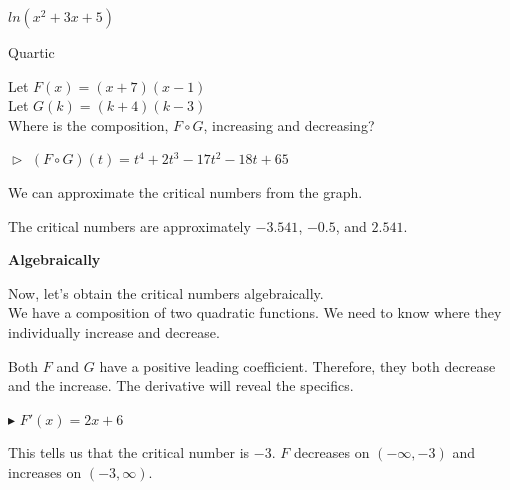 \documentclass{ximera}
\begin{document}
\begin{example}   $ln(x^2 + 3x + 5)$




\end{example}



















\begin{example}   Quartic



Let $F(x) = (x+7)(x-1)$ \\


Let $G(k) = (k+4)(k-3)$ \\



Where is the composition, $F \circ G$, increasing and decreasing?


$\vartriangleright$   $(F \circ G)(t) = t^4 +2 t^3 -17 t^2 - 18 t + 65$





We can approximate the critical numbers from the graph.



\begin{center}
\end{center}


The critical numbers are approximately $-3.541$, $-0.5$, and $2.541$.


\textbf{\textcolor{red!80!black}{Algebraically}}


Now, let's obtain the critical numbers algebraically. \\


We have a composition of two quadratic functions.  We need to know where they individually increase and decrease.

Both $F$ and $G$ have a positive leading coefficient.  Therefore, they both decrease and the increase. The derivative will reveal the specifics.



$\blacktriangleright$  $F'(x) = 2x + 6$

This tells us that the critical number is $-3$.  $F$ decreases on $(-\infty, -3)$ and increases on $(-3, \infty)$.


\end{example}
\end{document}
